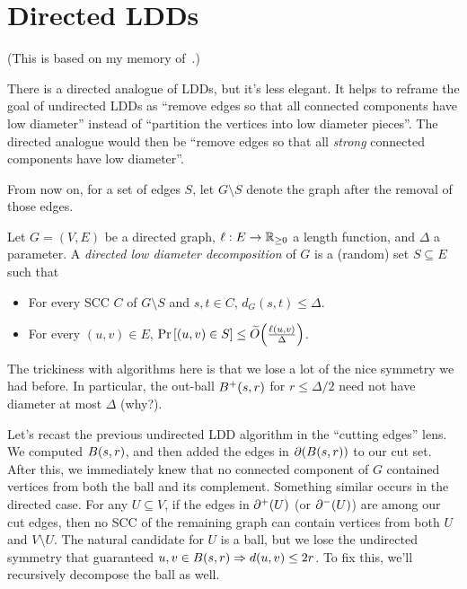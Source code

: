 \documentclass[12pt]{article}
\begin{document}
\section{Directed LDDs}

(This is based on my memory of~\cite{BNW25}.)

There is a directed analogue of LDDs, but it's less elegant. It helps to reframe
the goal of undirected LDDs as ``remove edges so that all connected components
have low diameter'' instead of ``partition the vertices into low diameter
pieces''. The directed analogue would then be ``remove edges so that all
\emph{strong} connected components have low diameter''.

From now on, for a set of edges $S$, let $G \setminus S$ denote the graph after
the removal of those edges.
\begin{definition}
  Let $G = (V, E)$ be a directed graph, $\ell : E \to \mathbb{R}_{\geq 0}$ a length
  function, and $\Delta$ a parameter. A \emph{directed low diameter
  decomposition} of $G$ is a (random) set $S \subseteq E$ such that
  \begin{itemize}
    \item For every SCC $C$ of $G \setminus S$ and $s, t \in C$,
          $d_G(s, t) \leq \Delta$.
    \item For every $(u, v) \in E$,
          $\Pr{(u, v) \in S} \leq \apxO{\frac{\ell(u, v)}{\Delta}}$.
  \end{itemize}
\end{definition}

The trickiness with algorithms here is that we lose a lot of the nice symmetry
we had before. In particular, the out-ball $\outball{s, r}$ for
$r \leq \Delta/2$ need not have diameter at most $\Delta$ (why?).

Let's recast the previous undirected LDD algorithm in the ``cutting edges''
lens. We computed $\ball{s, r}$, and then added the edges in $\cut{\ball{s, r}}$
to our cut set. After this, we immediately knew that no connected component of
$G$ contained vertices from both the ball and its complement. Something similar
occurs in the directed case. For any $U \subseteq V$, if the edges in
$\outcut{U}$ (or $\incut{U}$) are among our cut edges, then no SCC of the
remaining graph can contain vertices from both $U$ and $V \setminus U$. The
natural candidate for $U$ is a ball, but we lose the undirected symmetry that
guaranteed $u, v \in \ball{s, r} \Rightarrow d(u, v) \leq 2r$. To fix this,
we'll recursively decompose the ball as well.
\end{document}

